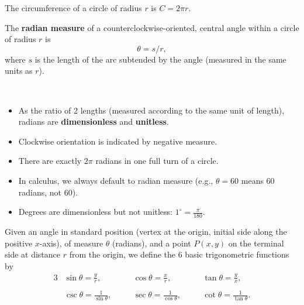 \setcounter{chapter}{1}
\setcounter{section}{3}
\setcounter{theorem}{0}
\setcounter{equation}{0}


\begin{theorem}
The circumference of a circle of radius $r$ is $C=2\pi r$.
\end{theorem}

\begin{definition}
The \textbf{radian measure} of a counterclockwise-oriented, central angle within a circle of radius $r$ is $$\theta = s/r,$$ where $s$ is the length of the arc subtended by the angle (measured in the same units as $r$).
\end{definition}

\begin{figure}[H]
\end{figure}

\begin{remark}\,
\begin{itemize}
\item As the ratio of 2 lengths (measured according to the same unit of length), radians are \textbf{dimensionless} and \textbf{unitless}.
\item Clockwise orientation is indicated by negative measure.
\item There are exactly $2\pi$ radians in one full turn of a circle.
\item In calculus, we always default to radian measure (e.g., $\theta=60$ means 60 radians, not 60\textdegree).
\item Degrees are dimensionless but not unitless: $1^\circ=\frac{\pi}{180}$.
\end{itemize}
\end{remark}

\newpage

\begin{definition}
Given an angle in standard position (vertex at the origin, initial side along the positive $x$-axis), of measure $\theta$ (radians), and a point $P(x,y)$ on the terminal side at distance $r$ from the origin, 
we define the 6 basic trigonometric functions by
\begin{alignat*}{3}
&\sin\theta = \frac{y}{r},\quad && \cos\theta = \frac{x}{r},\quad && \tan\theta = \frac{y}{x},\\
\\
&\csc\theta = \frac{1}{\sin\theta},\quad && \sec\theta = \frac{1}{\cos\theta},\quad && \cot\theta = \frac{1}{\tan\theta}.
\end{alignat*}
\end{definition}

